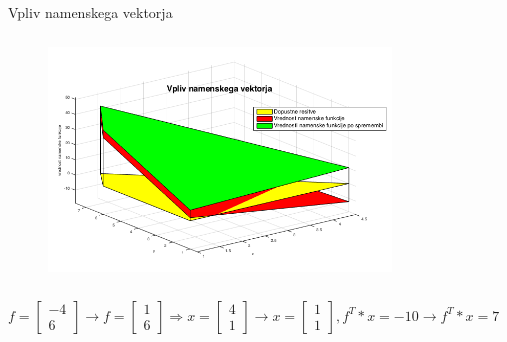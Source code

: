 \documentclass[t]{beamer}
\begin{document}
\begin{frame}{Vpliv namenskega vektorja}
\begin{center}
\begin{figure}[h]
\includegraphics[width=9.1cm,height=6.5cm]{viz2.png}
\end{figure}
$f=\begin{bmatrix} -4\\6 \end{bmatrix} \to f=\begin{bmatrix} 1 \\ 6\end{bmatrix} \Rightarrow x=\begin{bmatrix} 4 \\ 1 \end{bmatrix} \to x=\begin{bmatrix} 1 \\ 1\end{bmatrix}, f^T*x=-10 \to f^T*x=7$
\end{center}
\end{frame}
\end{document}
